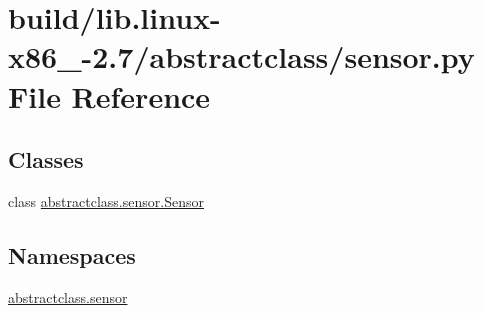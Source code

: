 \hypertarget{build_2lib_8linux-x86__64-2_87_2abstractclass_2sensor_8py}{}\section{build/lib.linux-\/x86\+\_-\/2.7/abstractclass/sensor.py File Reference}
\label{build_2lib_8linux-x86__64-2_87_2abstractclass_2sensor_8py}
\subsection*{Classes}
\begin{DoxyCompactItemize}
\item 
class \hyperlink{classabstractclass_1_1sensor_1_1Sensor}{abstractclass.\+sensor.\+Sensor}
\end{DoxyCompactItemize}
\subsection*{Namespaces}
\begin{DoxyCompactItemize}
\item 
 \hyperlink{namespaceabstractclass_1_1sensor}{abstractclass.\+sensor}
\end{DoxyCompactItemize}
